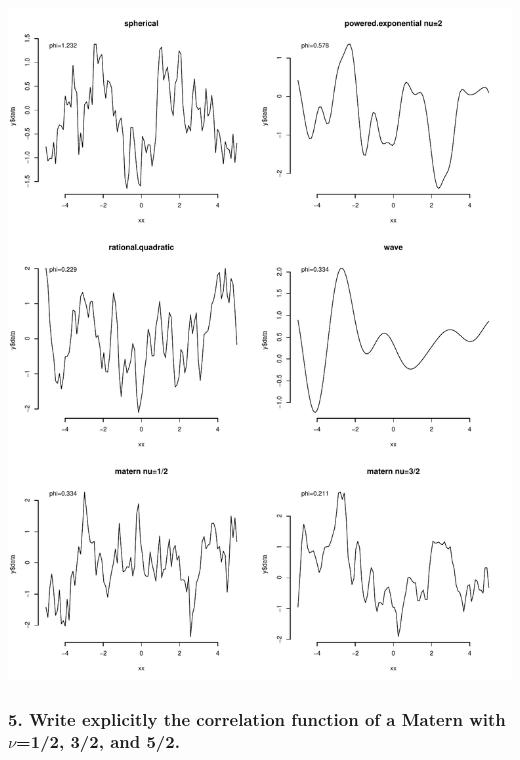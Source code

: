 \documentclass[12pt]{article}
\begin{document}
\begin{center}
\includegraphics[scale=0.67]{figs/simulations.pdf}
\end{center}

\subsubsection*{5. Write explicitly the correlation function of a Matern with $\nu$=1/2, 3/2, and 5/2.}
\end{document}

